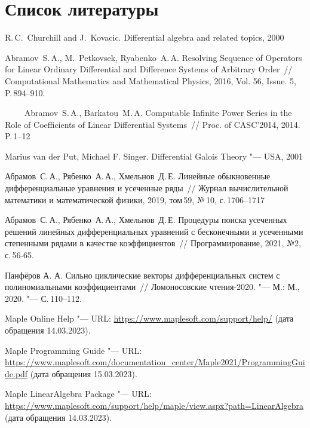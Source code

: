\section{Список литературы}

\begingroup
\renewcommand{\section}[2]{}

\begin{thebibliography}{10}

        R.\,C.~Churchill and J.~Kovacic.
        Differential algebra and related topics, 2000
    
        Abramov~S.\,A., M.~Petkovsek, Ryabenko~A.\,A.
        Resolving Sequence of Operators for Linear Ordinary Differential and Difference Systems of Arbitrary Order~//
        Computational Mathematics and Mathematical Physics, 2016, Vol. 56, Issue. 5, P.\,894–910.
    
        Abramov~S.\,A., Barkatou~M.\,A.
        Computable Infinite Power Series in the Role of Coefficients of Linear Differential Systems~//
        Proc. of CASC’2014, 2014. P.\,1--12
    
        Marius van der Put, Michael F. Singer.
        Differential Galois Theory "--- USA, 2001

        Абрамов~С.\,А., Рябенко~А.\,А., Хмельнов~Д.\,Е.
        Линейные обыкновенные дифференциальные уравнения и усеченные ряды~//
        Журнал вычислительной математики и математической физики, 2019, том\,59, №\,10, с.\,1706--1717

        Абрамов~С.\,А., Рябенко~А.\,А., Хмельнов~Д.\,Е.
        Процедуры поиска усеченных решений линейных дифференциальных уравнений с бесконечными и усеченными степенными рядами в качестве коэффициентов~//
        Программирование, 2021, №2, с.\,56-65.

        Панфёров А. А.
        Сильно циклические векторы дифференциальных систем с полиномиальными коэффициентами~//
        Ломоносовские чтения-2020. "--- М.: М., 2020. "--- С.\,110--112.
    
        Maple Online Help "--- URL: \url{https://www.maplesoft.com/support/help/} (дата обращения 14.03.2023).
    
        Maple Programming Guide "--- URL: \url{https://www.maplesoft.com/documentation_center/Maple2021/ProgrammingGuide.pdf} (дата обращения 15.03.2023).

        Maple LinearAlgebra Package "--- URL: \url{https://www.maplesoft.com/support/help/maple/view.aspx?path=LinearAlgebra} (дата обращения 14.03.2023).
    
\end{thebibliography}

\endgroup
